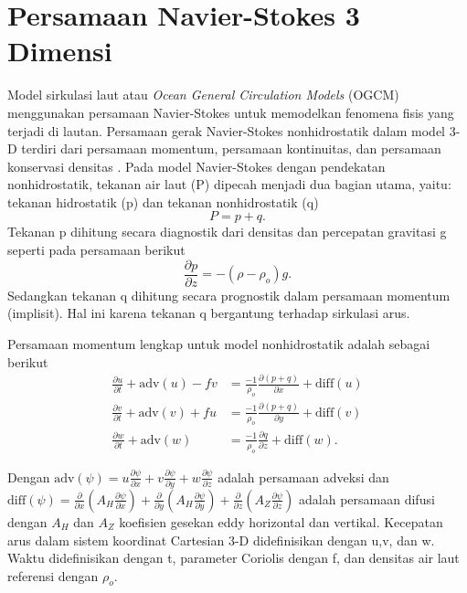 \section[Persamaan Navier-Stokes 3 Dimensi]{Persamaan Navier-Stokes 3 Dimensi}
\begin{spacing}{1.5}
	\par Model sirkulasi laut atau \textit{Ocean General Circulation Models} (OGCM) menggunakan persamaan Navier-Stokes untuk memodelkan fenomena fisis yang terjadi di lautan. Persamaan gerak Navier-Stokes nonhidrostatik dalam model 3-D terdiri dari persamaan momentum, persamaan kontinuitas, dan persamaan konservasi densitas . Pada model Navier-Stokes dengan pendekatan nonhidrostatik, tekanan air laut (P) dipecah menjadi dua bagian utama, yaitu: tekanan hidrostatik (p) dan tekanan nonhidrostatik (q)
	\begin{equation}
		P = p+q.
	\end{equation}
	Tekanan p dihitung secara diagnostik dari densitas  dan percepatan gravitasi g seperti pada persamaan berikut 
	\begin{equation}
		\frac{\partial p}{\partial z} = -(\rho - \rho_o)g.
	\end{equation}
	Sedangkan tekanan q dihitung secara prognostik dalam persamaan momentum (implisit). Hal ini karena tekanan q bergantung terhadap sirkulasi arus.
	\par Persamaan momentum lengkap untuk model nonhidrostatik adalah sebagai berikut
	\begin{equation}\label{eq:momentum}
		\begin{aligned}
			\frac{\partial u}{\partial t} + \text{adv}(u)-fv &= \frac{-1}{\rho_o}\frac{\partial(p+q)}{\partial x}+\text{diff}(u) \\
			\frac{\partial v}{\partial t} + \text{adv}(v)+fu &= \frac{-1}{\rho_o}\frac{\partial(p+q)}{\partial y}+\text{diff}(v) \\
			\frac{\partial w}{\partial t} +\text{adv}(w) &= \frac{-1}{\rho_o}\frac{\partial q}{\partial z}+\text{diff}(w).
		\end{aligned}	
	\end{equation}
	\par Dengan $\text{adv}(\psi)=u\frac{\partial \psi}{\partial x}+v\frac{\partial \psi}{\partial y}+w\frac{\partial \psi}{\partial z}$ adalah persamaan adveksi dan $\text{diff}(\psi)=\frac{\partial}{\partial x}(A_{H} \frac{\partial \psi}{\partial x})+\frac{\partial}{\partial y}(A_{H} \frac{\partial \psi}{\partial y})+\frac{\partial}{\partial z}(A_{Z} \frac{\partial \psi}{\partial z})$ adalah persamaan difusi dengan $A_H$ dan $A_Z$ koefisien gesekan eddy horizontal dan vertikal. Kecepatan arus dalam sistem koordinat Cartesian 3-D didefinisikan dengan u,v, dan w. Waktu didefinisikan dengan t, parameter Coriolis dengan f, dan densitas air laut referensi dengan $\rho_o$.
	

\end{spacing}
